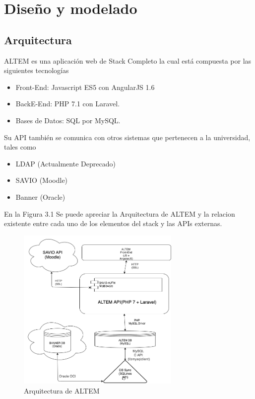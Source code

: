 \chapter{Diseño y modelado}

\section{Arquitectura}
ALTEM es una aplicación web de Stack Completo la cual está compuesta por las siguientes tecnologías
\begin{itemize}
    \item Front-End: Javascript ES5 con AngularJS 1.6
    \item BackE-End: PHP 7.1 con Laravel.
    \item Bases de Datos: SQL por MySQL.
\end{itemize}

Su API también se comunica con otros sistemas que pertenecen a la universidad, tales como

\begin{itemize}
    \item LDAP (Actualmente Deprecado)
    \item SAVIO (Moodle)
    \item Banner (Oracle)
\end{itemize}

En la Figura 3.1 Se puede apreciar la Arquitectura de ALTEM y la relacion existente entre cada uno de los elementos del stack y las APIs externas. 

\begin{figure}[H]
    \centering
    \includegraphics[width=0.7\textwidth]{img/ALTEM.png}
    \caption{Arquitectura de ALTEM}
\end{figure}

